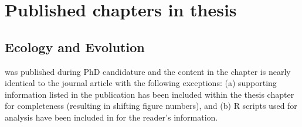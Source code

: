 \chapter{Published chapters in thesis}\label{apx:D}
\newpage

\section{Ecology and Evolution}

 was published during PhD candidature and the content in the chapter is nearly identical to the journal article with the following exceptions: (a) supporting information listed in the publication has been included within the thesis chapter for completeness (resulting in shifting figure numbers), and (b) R scripts used for analysis have been included in  for the reader's information.

